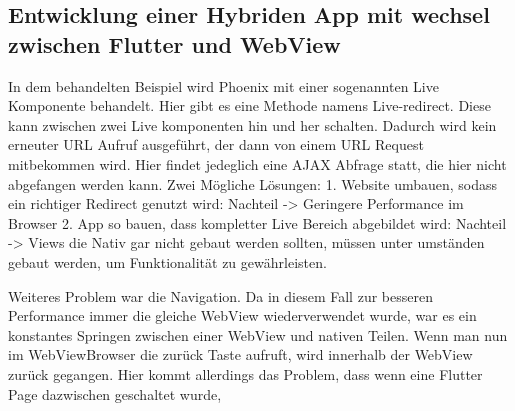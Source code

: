 
\subsection{Entwicklung einer Hybriden App mit wechsel zwischen Flutter und WebView}
In dem behandelten Beispiel wird Phoenix mit einer sogenannten Live Komponente behandelt. Hier gibt es eine Methode namens Live-redirect. Diese kann zwischen zwei Live komponenten hin und her schalten. Dadurch wird kein erneuter URL Aufruf ausgeführt, der dann von einem URL Request mitbekommen wird. Hier findet jedeglich eine AJAX Abfrage statt, die hier nicht abgefangen werden kann.
Zwei Mögliche Lösungen:
1. Website umbauen, sodass ein richtiger Redirect genutzt wird: Nachteil -> Geringere Performance im Browser
2. App so bauen, dass kompletter Live Bereich abgebildet wird: Nachteil -> Views die Nativ gar nicht gebaut werden sollten, müssen unter umständen gebaut werden, um Funktionalität zu gewährleisten.

Weiteres Problem war die Navigation. Da in diesem Fall zur besseren Performance immer die gleiche WebView wiederverwendet wurde, war es ein konstantes Springen zwischen einer WebView und nativen Teilen. Wenn man nun im WebViewBrowser die zurück Taste aufruft, wird innerhalb der WebView zurück gegangen. Hier kommt allerdings das Problem, dass wenn eine Flutter Page dazwischen geschaltet wurde, 